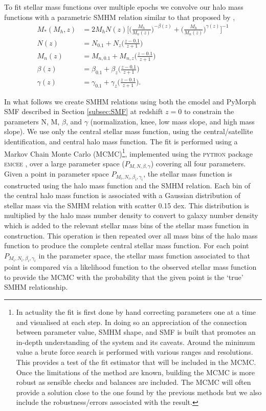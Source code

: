 To fit stellar mass functions over multiple epochs we convolve our halo mass functions with a parametric SMHM relation similar to that proposed by \cite{Moster2010},
\begin{equation}
\label{eqn:MosAbn}
\begin{split}
M_*(M_h, z) &= 2M_hN(z)\Big[ \Big( \frac{M_h}{M_{n}(z)}\Big) ^{- \beta(z)} + \Big( \frac{M_h}{M_{n}(z)}\Big)^{\gamma(z)} \Big ]^{-1}\\
N(z) &= N_{0.1} +N_z\Big(\frac{z-0.1}{z+1}\Big)\\
M_{n}(z) &= M_{n,0.1} +M_{n,z}\Big(\frac{z-0.1}{z+1}\Big)\\
\beta(z) &= \beta_{0.1} +\beta_z\Big(\frac{z-0.1}{z+1}\Big)\\
\gamma(z) &= \gamma_{0.1} +\gamma_z\Big(\frac{z-0.1}{z+1}\Big).
\end{split}
\end{equation}

In what follows we create SMHM relations using both the cmodel and PyMorph SMF described in Section \ref{subsec:SMF} at redshift $z=0$ to constrain the parameters N, M, $\beta$, and $\gamma$ (normalization, knee, low mass slope, and high mass slope). We use only the central stellar mass function, using the \cite{Yang2012EvolutionHalos} central/satellite identification, and central halo mass function. The fit is performed using a Markov Chain Monte Carlo (MCMC)\footnote{In actuality the fit is first done by hand correcting parameters one at a time and visualised at each step. In doing so an appreciation of the connection between parameter value, SMHM shape, and SMF is built that promotes an in-depth understanding of the system and its caveats. Around the minimum value a brute force search is performed with various ranges and resolutions. This provides a test of the fit estimator that will be included in the MCMC. Once the limitations of the method are known, building the MCMC is more robust as sensible checks and balances are included. The MCMC will often provide a solution close to the one found by the previous methods but we also include the robustness/errors associated with the result.}, implemented using the \textsc{python} package \textsc{emcee} \citep{Foreman-Mackey2013EmceeHammer}, over a large parameter space ($P_{M, N, \beta, \gamma}$) covering all four parameters. Given a point in parameter space $P_{M_i, N_i, \beta_i, \gamma_i}$, the stellar mass function is constructed using the halo mass function and the SMHM relation. Each bin of the central halo mass function is associated with a Gaussian distribution of stellar mass via the SMHM relation with scatter 0.15 dex. This distribution is multiplied by the halo mass number density to convert to galaxy number density which is added to the relevant stellar mass bins of the stellar mass function in construction. This operation is then repeated over all mass bins of the halo mass function to produce the complete central stellar mass function. For each point $P_{M_i, N_i, \beta_i, \gamma_i}$ in the parameter space, the stellar mass function associated to that point is compared via a likelihood function to the observed stellar mass function to provide the MCMC with the probability that the given point is the `true' SMHM relationship. 

